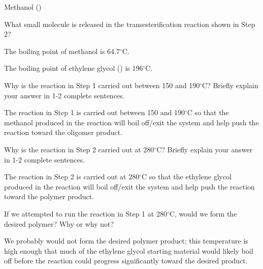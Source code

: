 \begin{activity}
\begin{ctqs}
			\begin{solution}[0.75in]
				Methanol ()
			\end{solution}
		
		\question What small molecule is released in the transesterification reaction shown in Step 2?
		
			\begin{solution}[0.75in]
			\end{solution}
			
\end{ctqs}

\begin{infobox}
	
	The boiling point of methanol is 64.7${}^\circ$C.
	
	The boiling point of ethylene glycol () is 196${}^\circ$C.
	
\end{infobox}

\begin{ctqs}
	
	\question Why is the reaction in Step 1 carried out between 150 and 190${}^\circ$C?  Briefly explain your answer in 1-2 complete sentences.
	
		\begin{solution}[2in]
			The reaction in Step 1 is carried out between 150 and 190${}^\circ$C so that the methanol produced in the reaction will boil off/exit the system and help push the reaction toward the oligomer product.
		\end{solution}
	
	\question Why is the reaction in Step 2 carried out at 280${}^\circ$C?  Briefly explain your answer in 1-2 complete sentences.
	
		\begin{solution}[2in]
			The reaction in Step 2 is carried out at 280${}^\circ$C so that the ethylene glycol produced in the reaction will boil off/exit the system and help push the reaction toward the polymer product.
		\end{solution}
	
	\question If we attempted to run the reaction in Step 1 at 280${}^\circ$C, would we form the desired polymer? Why or why not?
	
		\begin{solution}[2in]
			We probably would not form the desired polymer product; this temperature is high enough that much of the ethylene glycol starting material would likely boil off before the reaction could progress significantly toward the desired product.
		\end{solution}
		

\end{ctqs}
\end{activity}
